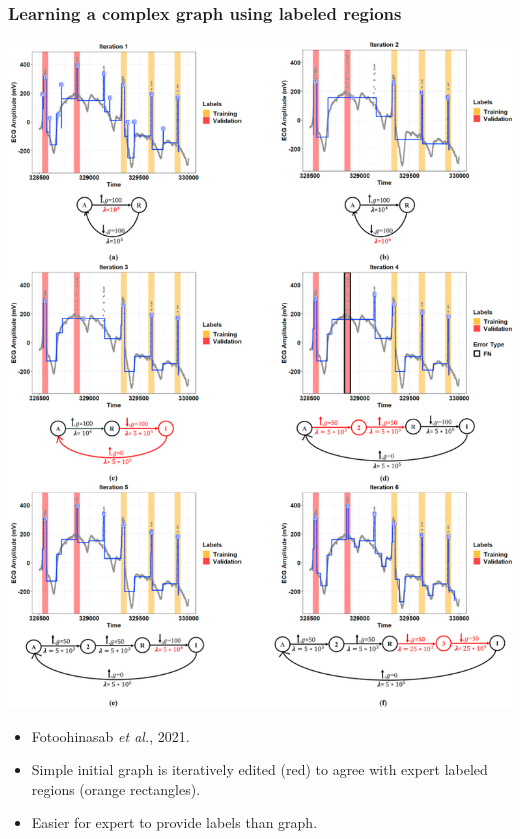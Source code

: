 \documentclass{beamer}
\begin{document}
\begin{frame}
  \frametitle{Learning a complex graph using labeled regions}
\parbox{0.6\textwidth}{
  \includegraphics[width=\linewidth]{gfpop-ecg-iterations}
} \parbox{0.35\textwidth}{
  \begin{itemize}
  \item  Fotoohinasab \emph{et al.}, 2021.
\item Simple initial graph is iteratively edited (red) to agree with expert
 labeled regions (orange rectangles).
\item Easier for expert to provide labels than graph.
  \end{itemize}
 }
\end{frame}

 
\end{document}
